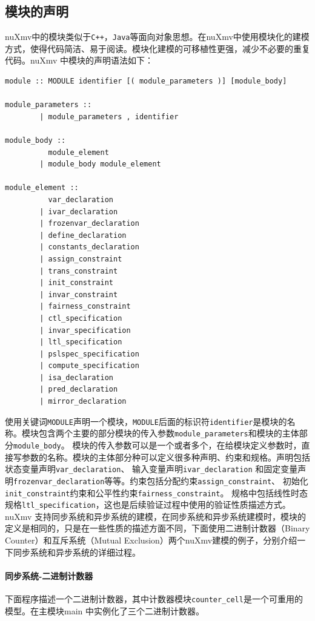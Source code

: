 \subsection{模块的声明}
nuXmv中的模块类似于\verb|C++|，\verb|Java|等面向对象思想。在nuXmv中使用模块化的建模方式，使得代码简洁、易于阅读。模块化建模的可移植性更强，减少不必要的重复代码。nuXmv 中模块的声明语法如下：

\begin{lstlisting}
module :: MODULE identifier [( module_parameters )] [module_body]

module_parameters ::
        | module_parameters , identifier

module_body ::
          module_element
        | module_body module_element

module_element ::
          var_declaration
        | ivar_declaration
        | frozenvar_declaration
        | define_declaration
        | constants_declaration
        | assign_constraint
        | trans_constraint
        | init_constraint
        | invar_constraint
        | fairness_constraint
        | ctl_specification
        | invar_specification
        | ltl_specification
        | pslspec_specification
        | compute_specification
        | isa_declaration
        | pred_declaration
        | mirror_declaration
\end{lstlisting}

使用关键词\verb|MODULE|声明一个模块，\verb|MODULE|后面的标识符\verb|identifier|是模块的名称。模块包含两个主要的部分模块的传入参数\verb|module_parameters|和模块的主体部分\verb|module_body|。 模块的传入参数可以是一个或者多个，在给模块定义参数时，直接写参数的名称。模块的主体部分种可以定义很多种声明、约束和规格。声明包括状态变量声明\verb|var_declaration|、 输入变量声明\verb|ivar_declaration| 和固定变量声明\verb|frozenvar_declaration|等等。约束包括分配约束\verb|assign_constraint|、 初始化\verb|init_constraint|约束和公平性约束\verb|fairness_constraint|。 规格中包括线性时态规格\verb|ltl_specification|，这也是后续验证过程中使用的验证性质描述方式。nuXmv 支持同步系统和异步系统的建模，在同步系统和异步系统建模时，模块的定义是相同的，只是在一些性质的描述方面不同，下面使用二进制计数器（Binary Counter）和互斥系统（Mutual Exclusion）两个nuXmv建模的例子，分别介绍一下同步系统和异步系统的详细过程。

\paragraph{同步系统-二进制计数器}
下面程序描述一个二进制计数器，其中计数器模块\verb|counter_cell|是一个可重用的模型。在主模块main 中实例化了三个二进制计数器。

